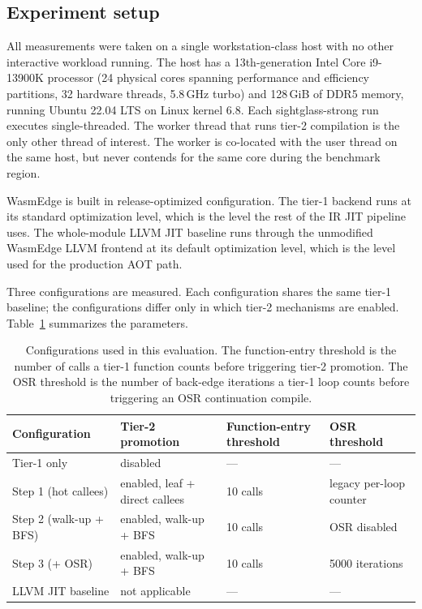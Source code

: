 \subsection{Experiment setup}
\label{sec:eval:method:setup}

All measurements were taken on a single workstation-class host with no other interactive workload running. The host has a 13th-generation Intel Core i9-13900K processor (24 physical cores spanning performance and efficiency partitions, 32 hardware threads, 5.8\,GHz turbo) and 128\,GiB of DDR5 memory, running Ubuntu 22.04 LTS on Linux kernel 6.8. Each sightglass-strong run executes single-threaded. The worker thread that runs tier-2 compilation is the only other thread of interest. The worker is co-located with the user thread on the same host, but never contends for the same core during the benchmark region.

WasmEdge is built in release-optimized configuration. The tier-1 backend runs at its standard optimization level, which is the level the rest of the IR JIT pipeline uses. The whole-module LLVM JIT baseline runs through the unmodified WasmEdge LLVM frontend at its default optimization level, which is the level used for the production AOT path.

Three configurations are measured. Each configuration shares the same tier-1 baseline; the configurations differ only in which tier-2 mechanisms are enabled. Table~\ref{tbl:eval:params} summarizes the parameters.

\begin{table}[h]
\centering
\small
\begin{tabular}{l p{3.5cm} p{3.5cm} p{3.0cm}}
\toprule
Configuration & Tier-2 promotion & Function-entry threshold & OSR threshold \\
\midrule
Tier-1 only           & disabled                       & ---       & --- \\
Step 1 (hot callees)  & enabled, leaf + direct callees & 10 calls  & legacy per-loop counter \\
Step 2 (walk-up + BFS) & enabled, walk-up + BFS        & 10 calls  & OSR disabled \\
Step 3 (+ OSR)        & enabled, walk-up + BFS         & 10 calls  & 5000 iterations \\
LLVM JIT baseline     & not applicable                 & ---       & --- \\
\bottomrule
\end{tabular}
\caption{Configurations used in this evaluation. The function-entry threshold is the number of calls a tier-1 function counts before triggering tier-2 promotion. The OSR threshold is the number of back-edge iterations a tier-1 loop counts before triggering an OSR continuation compile.}
\label{tbl:eval:params}
\end{table}

